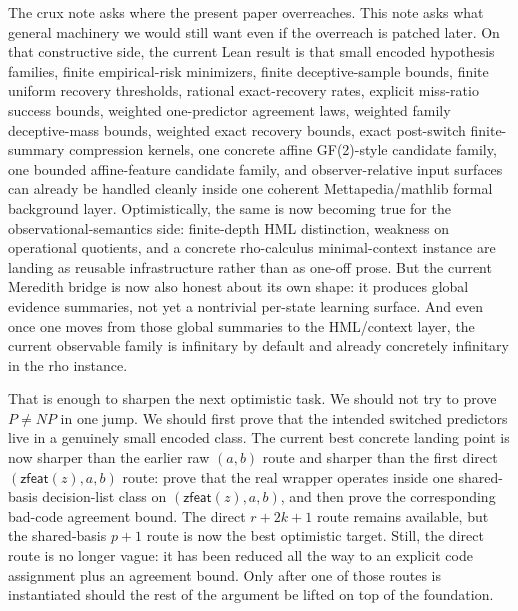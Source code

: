 \documentclass[11pt]{article}
\theoremstyle{remark}
\begin{document}
The crux note asks where the present paper overreaches.  This note asks what
general machinery we would still want even if the overreach is patched later.
On that constructive side, the current Lean result is that small encoded
hypothesis families, finite empirical-risk minimizers, finite deceptive-sample
bounds, finite uniform recovery thresholds, rational exact-recovery rates,
explicit miss-ratio success bounds, weighted one-predictor agreement laws,
weighted family deceptive-mass bounds, weighted exact recovery bounds, exact
post-switch finite-summary compression kernels, one concrete affine GF(2)-style
candidate family, one bounded affine-feature candidate family, and
observer-relative input surfaces can already be handled cleanly inside one
coherent Mettapedia/mathlib formal background layer.  Optimistically, the same is
now becoming true for the observational-semantics side: finite-depth HML
distinction, weakness on operational quotients, and a concrete rho-calculus
minimal-context instance are landing as reusable infrastructure rather than as
one-off prose.  But the current Meredith bridge is now also honest about its own
shape: it produces global evidence summaries, not yet a nontrivial per-state
learning surface.  And even once one moves from those global summaries to the
HML/context layer, the current observable family is infinitary by default and
already concretely infinitary in the rho instance.

That is enough to sharpen the next optimistic task.  We should not try to prove
\(P \neq NP\) in one jump.  We should first prove that the intended switched
predictors live in a genuinely small encoded class.  The current best concrete
landing point is now sharper than the earlier raw \((a,b)\) route and sharper
than the first direct \((\mathsf{zfeat}(z),a,b)\) route: prove that the real
wrapper operates inside one shared-basis decision-list class on
\((\mathsf{zfeat}(z),a,b)\), and then prove the corresponding bad-code
agreement bound.  The direct \(r+2k+1\) route remains available, but the
shared-basis \(p+1\) route is now the best optimistic target.  Still, the
direct route is no longer vague: it has been reduced all the way to an explicit
code assignment plus an agreement bound.  Only after one of those routes is
instantiated should the rest of the argument be lifted on top of the
foundation.
\end{document}
